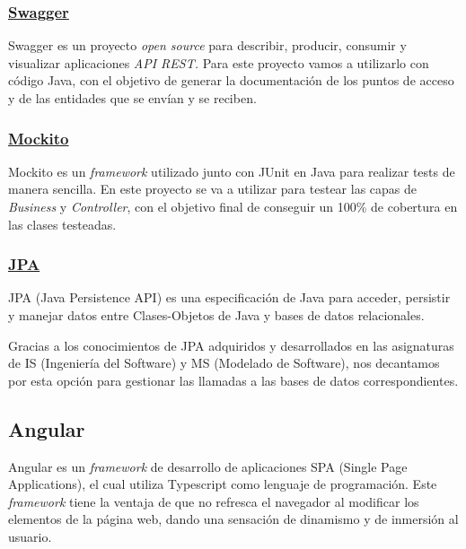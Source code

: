     

        \subsubsection{\underline{Swagger}}
        Swagger\cite{swagger} es un proyecto \textit{open source} para describir, producir, consumir y visualizar aplicaciones \textit{API REST.} Para este proyecto vamos a utilizarlo con código Java, con el objetivo de generar la documentación de los puntos de acceso y de las entidades que se envían y se reciben.

        
        \subsubsection{\underline{Mockito}}
        Mockito\cite{mockito} es un \textit{framework} utilizado junto con JUnit\cite{junit} en Java para realizar tests de manera sencilla. En este proyecto se va a utilizar para testear las capas de \emph{Business} y \emph{Controller}, con el objetivo final de conseguir un 100\% de cobertura en las clases testeadas.
        \newline
        

        \subsubsection{\underline{JPA}}
        JPA\cite{jpa} (Java Persistence API) es una especificación de Java para acceder, persistir y manejar datos entre Clases-Objetos de Java y bases de datos relacionales.
        \newline
        
        Gracias a los conocimientos de JPA adquiridos y desarrollados en las asignaturas de IS (Ingeniería del Software) y MS (Modelado de Software), nos decantamos por esta opción para gestionar las llamadas a las bases de datos correspondientes.
        

     \subsection{Angular}
       Angular\cite{angular} es un \textit{framework} de desarrollo de aplicaciones SPA (Single Page Applications), el cual utiliza Typescript como lenguaje de programación. Este \textit{framework} tiene la ventaja de que no refresca el navegador al modificar los elementos de la página web, dando una sensación de dinamismo y de inmersión al usuario.
       \newline
       

